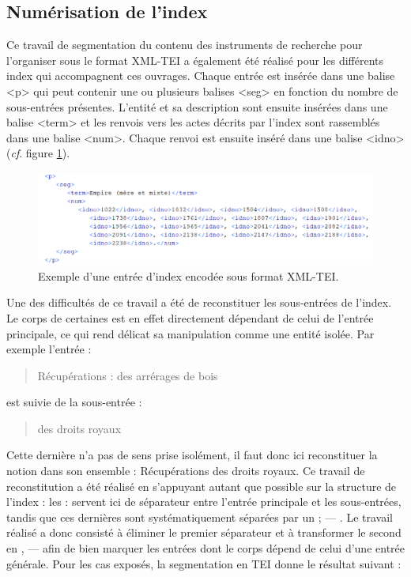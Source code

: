 \documentclass[a4paper,12pt,twoside]{book}
\begin{document}
	\subsection{Numérisation de l’index}

	Ce travail de segmentation du contenu des instruments de recherche pour l'organiser sous le format XML-TEI a également été réalisé pour les différents index qui accompagnent ces ouvrages. Chaque entrée est insérée dans une balise <p> qui peut contenir une ou plusieurs balises <seg> en fonction du nombre de sous-entrées présentes. L'entité et sa description sont ensuite insérées dans une balise <term> et les renvois vers les actes décrits par l'index sont rassemblés dans une balise <num>. Chaque renvoi est ensuite inséré dans une balise <idno> (\textit{cf}. figure \ref{index_TEI}).
	
	\begin{figure}
		\centering
		\includegraphics[width=\textwidth]{Images/index_en_TEI.png}
		\caption{Exemple d'une entrée d'index encodée sous format XML-TEI.}
		\label{index_TEI}
	\end{figure} 
	
	Une des difficultés de ce travail a été de reconstituer les sous-entrées de l'index. Le corps de certaines est en effet directement dépendant de celui de l'entrée principale, ce qui rend délicat sa manipulation comme une entité isolée. Par exemple l'entrée :
	
	\begin{quotation}
		Récupérations : des arrérages de bois
	\end{quotation}

	\noindent est suivie de la sous-entrée :
	
	\begin{quotation}
		des droits royaux
	\end{quotation}

	\noindent Cette dernière n'a pas de sens prise isolément, il faut donc ici reconstituer la notion dans son ensemble : \og Récupérations des droits royaux\fg{}. Ce travail de reconstitution a été réalisé en s'appuyant autant que possible sur la structure de l'index : les \og :\fg{} servent ici de séparateur entre l'entrée principale et les sous-entrées, tandis que ces dernières sont systématiquement séparées par un \og ; — \fg{}. Le travail réalisé a donc consisté à éliminer le premier séparateur et à transformer le second en \og{}  , — \fg{} afin de bien marquer les entrées dont le corps dépend de celui d'une entrée générale. Pour les cas exposés, la segmentation en TEI donne le résultat suivant :
	
\end{document}

